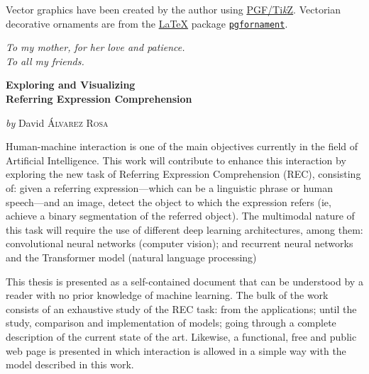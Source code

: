Vector graphics have been created by the author using
\href{https://www.ctan.org/pkg/pgf}{PGF/Ti\emph{k}Z}. Vectorian decorative
ornaments are from the \href{https://www.latex-project.org//}{\LaTeX} package
\href{https://ctan.org/pkg/pgfornament}{\texttt{pgfornament}}.


\doclicenseThis
\normalsize



\cleardoublepage
\thispagestyle{empty}
\begin{flushright}
  \itshape
  To my mother, for her love and patience. \\
  To all my friends.
\end{flushright}



\cleardoublepage
\thispagestyle{plain}
\null\vfill

\begin{center}
  \Large
  \textbf{Exploring and Visualizing\\
    Referring Expression Comprehension}

  \vspace{2ex}
  \large
  \textit{by} David \textsc{Álvarez Rosa}

  \vspace{3ex}
  \textbf{\abstractname}
\end{center}

\vspace{-2ex}
\noindent Human-machine interaction is one of the main objectives currently in
the field of Artificial Intelligence. This work will contribute to enhance this
interaction by exploring the new task of Referring Expression Comprehension
(REC), consisting of: given a referring expression---which can be a linguistic
phrase or human speech---and an image, detect the object to which the
expression refers (ie, achieve a binary segmentation of the referred
object). The multimodal nature of this task will require the use of different
deep learning architectures, among them: convolutional neural networks
(computer vision); and recurrent neural networks and the Transformer model
(natural language processing)

This thesis is presented as a self-contained document that can be understood by
a reader with no prior knowledge of machine learning. The bulk of the work
consists of an exhaustive study of the REC task: from the applications; until
the study, comparison and implementation of models; going through a complete
description of the current state of the art. Likewise, a functional, free and
public web page is presented in which interaction is allowed in a simple way
with the model described in this work.

